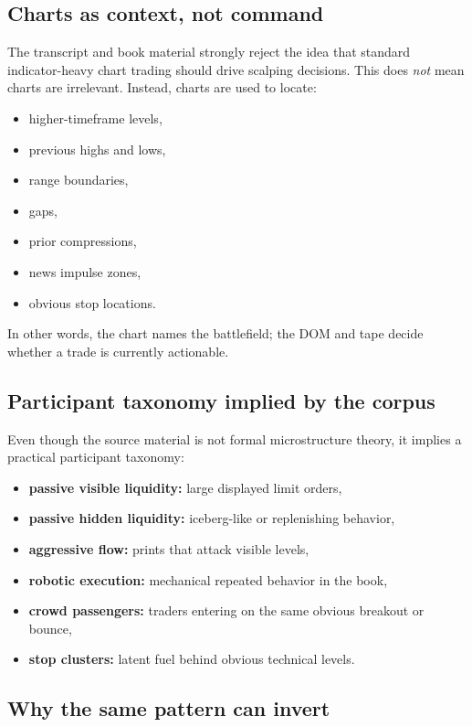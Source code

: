 \subsection{Charts as context, not command}

The transcript and book material strongly reject the idea that standard indicator-heavy chart trading should drive scalping decisions. This does \emph{not} mean charts are irrelevant. Instead, charts are used to locate:

\begin{itemize}
\item higher-timeframe levels,
\item previous highs and lows,
\item range boundaries,
\item gaps,
\item prior compressions,
\item news impulse zones,
\item obvious stop locations.
\end{itemize}

In other words, the chart names the battlefield; the DOM and tape decide whether a trade is currently actionable.

\subsection{Participant taxonomy implied by the corpus}

Even though the source material is not formal microstructure theory, it implies a practical participant taxonomy:

\begin{itemize}
\item \textbf{passive visible liquidity:} large displayed limit orders,
\item \textbf{passive hidden liquidity:} iceberg-like or replenishing behavior,
\item \textbf{aggressive flow:} prints that attack visible levels,
\item \textbf{robotic execution:} mechanical repeated behavior in the book,
\item \textbf{crowd passengers:} traders entering on the same obvious breakout or bounce,
\item \textbf{stop clusters:} latent fuel behind obvious technical levels.
\end{itemize}

\subsection{Why the same pattern can invert}

